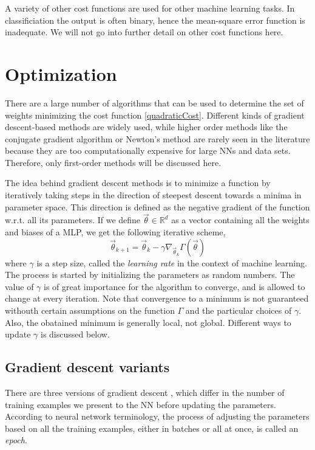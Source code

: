 \documentclass[twoside,english]{uiofysmaster}
\begin{document}
A variety of other cost functions are used for other machine learning tasks. In classificiation the output is often binary, 
hence the mean-square error function is inadequate. We will not go into further detail on other cost functions here. 


\section{Optimization} \label{sec:optimization}
There are a large number of algorithms that can be used to determine the set of weights minimizing the 
cost function \eqref{quadraticCost}. 
Different kinds of gradient descent-based methods are widely used, while higher order methods like
the conjugate gradient algorithm or Newton's method are rarely seen in the literature because they are 
too computationally expensive for large NNs and data sets. Therefore, only first-order methods will be discussed here. 

The idea behind gradient descent methods is to minimize a function by 
iteratively taking steps in the direction of steepest descent towards a minima in parameter space. 
This direction is defined as the negative gradient of the function w.r.t. 
all its parameters. If we define $\vec{\theta} \in \mathbb{R}^d$ as a vector containing all the weights and biases
of a MLP, we get the following iterative scheme,
\begin{equation}
 \vec{\theta}_{k+1} = \vec{\theta}_{k} - \gamma \nabla_{\vec{\theta}_k} \Gamma(\vec{\theta})
 \label{gradientDescent}
\end{equation}
where $\gamma$ is a step size, called the \textit{learning rate} in the context of machine learning. The process is started
by initializing the parameters as random numbers. The value of $\gamma$ is of great importance for the algorithm to converge,
and is allowed to change at every iteration. Note that convergence to 
a minimum is not guaranteed withouth certain assumptions on the function $\Gamma$ and the particular choices of $\gamma$.
Also, the obatained minimum is generally local, not global. 
Different ways to update $\gamma$ is discussed below.


\subsection{Gradient descent variants}
There are three versions of gradient descent \cite{Ruder16}, which differ in 
the number of training examples we present to the NN before updating the parameters. 
According to neural network terminology, the process of adjusting the parameters based on all the training examples,
either in batches or all at once, is called an \textit{epoch}. 
\end{document}
